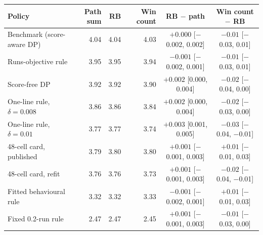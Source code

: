 \begin{tabular}{lrrrcc}
\toprule
Policy & Path sum & RB & Win count & RB $-$ path & Win count $-$ RB \\
\midrule
Benchmark (score-aware DP) & 4.04 & 4.04 & 4.03 & $+0.000$ [\ensuremath{-}0.002, 0.002] & $-0.01$ [\ensuremath{-}0.03, 0.01] \\
Runs-objective rule & 3.95 & 3.95 & 3.94 & $-0.001$ [\ensuremath{-}0.002, 0.001] & $-0.01$ [\ensuremath{-}0.03, 0.01] \\
Score-free DP & 3.92 & 3.92 & 3.90 & $+0.002$ [0.000, 0.004] & $-0.02$ [\ensuremath{-}0.04, 0.00] \\
One-line rule, $\delta=0.008$ & 3.86 & 3.86 & 3.84 & $+0.002$ [0.000, 0.004] & $-0.02$ [\ensuremath{-}0.03, 0.00] \\
One-line rule, $\delta=0.01$ & 3.77 & 3.77 & 3.74 & $+0.003$ [0.001, 0.005] & $-0.03$ [\ensuremath{-}0.04, \ensuremath{-}0.01] \\
48-cell card, published & 3.79 & 3.80 & 3.80 & $+0.001$ [\ensuremath{-}0.001, 0.003] & $+0.01$ [\ensuremath{-}0.01, 0.03] \\
48-cell card, refit & 3.76 & 3.76 & 3.73 & $+0.001$ [\ensuremath{-}0.001, 0.003] & $-0.02$ [\ensuremath{-}0.04, \ensuremath{-}0.01] \\
Fitted behavioural rule & 3.32 & 3.32 & 3.33 & $-0.001$ [\ensuremath{-}0.002, 0.001] & $+0.01$ [\ensuremath{-}0.01, 0.03] \\
Fixed 0.2-run rule & 2.47 & 2.47 & 2.45 & $+0.001$ [\ensuremath{-}0.001, 0.003] & $-0.01$ [\ensuremath{-}0.03, 0.00] \\
\bottomrule
\end{tabular}

